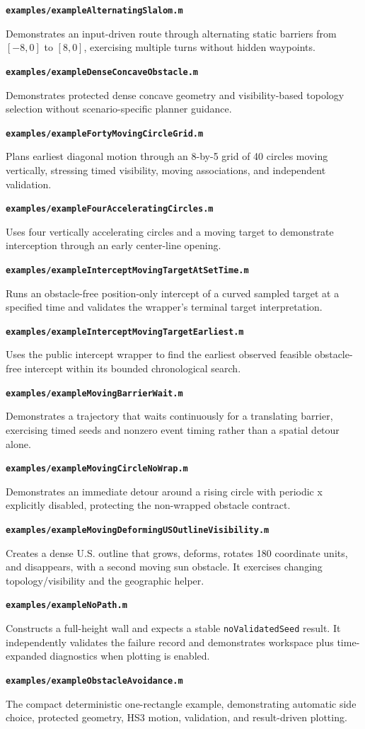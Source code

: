 \documentclass[10pt,letterpaper]{article}
\newcommand{\file}[1]{\nolinkurl{#1}}
\newcommand{\scriptentry}[2]{%
  \par\medskip\noindent\textbf{\file{#1}}\par
  \begingroup\raggedright #2\par\endgroup
}
\begin{document}
\scriptentry{examples/exampleAlternatingSlalom.m}{Demonstrates an input-driven
route through alternating static barriers from $[-8,0]$ to $[8,0]$, exercising
multiple turns without hidden waypoints.}

\scriptentry{examples/exampleDenseConcaveObstacle.m}{Demonstrates protected
dense concave geometry and visibility-based topology selection without
scenario-specific planner guidance.}

\scriptentry{examples/exampleFortyMovingCircleGrid.m}{Plans earliest diagonal
motion through an 8-by-5 grid of 40 circles moving vertically, stressing timed
visibility, moving associations, and independent validation.}

\scriptentry{examples/exampleFourAcceleratingCircles.m}{Uses four vertically
accelerating circles and a moving target to demonstrate interception through an
early center-line opening.}

\scriptentry{examples/exampleInterceptMovingTargetAtSetTime.m}{Runs an
obstacle-free position-only intercept of a curved sampled target at a specified
time and validates the wrapper's terminal target interpretation.}

\scriptentry{examples/exampleInterceptMovingTargetEarliest.m}{Uses the public
intercept wrapper to find the earliest observed feasible obstacle-free intercept
within its bounded chronological search.}

\scriptentry{examples/exampleMovingBarrierWait.m}{Demonstrates a trajectory
that waits continuously for a translating barrier, exercising timed seeds and
nonzero event timing rather than a spatial detour alone.}

\scriptentry{examples/exampleMovingCircleNoWrap.m}{Demonstrates an
immediate detour around a rising circle with periodic x explicitly
disabled, protecting the non-wrapped obstacle contract.}

\scriptentry{examples/exampleMovingDeformingUSOutlineVisibility.m}{Creates a
dense U.S. outline that grows, deforms, rotates 180 coordinate units, and disappears,
with a second moving sun obstacle. It exercises changing topology/visibility and
the geographic helper.}

\scriptentry{examples/exampleNoPath.m}{Constructs a full-height wall and
expects a stable \file{noValidatedSeed} result. It independently validates the
failure record and demonstrates workspace plus time-expanded diagnostics when
plotting is enabled.}

\scriptentry{examples/exampleObstacleAvoidance.m}{The compact deterministic
one-rectangle example, demonstrating automatic side choice, protected geometry,
HS3 motion, validation, and result-driven plotting.}
\end{document}
